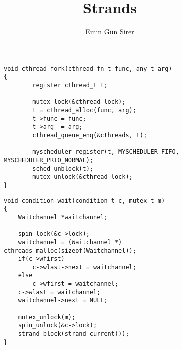 \batchmode
{}
\title{Strands}
\author{Emin G\"un Sirer}

\makeatother
\newenvironment{tex2html_wrap}{}{}
\newwrite\lthtmlwrite
\def\lthtmltypeout#1{{\let\protect\string\immediate\write\lthtmlwrite{#1}}}%
\newbox\sizebox

\pagestyle{empty}
{\newpage
\clearpage
\samepage \begin{figure}[hbt]

\end{figure}
}

{\newpage
\clearpage
\samepage \begin{figure}[hbt]
\begin{verbatim}void cthread_fork(cthread_fn_t func, any_t arg)
{
        register cthread_t t;
        
        mutex_lock(&cthread_lock);
        t = cthread_alloc(func, arg);
        t->func = func;
        t->arg  = arg;
        cthread_queue_enq(&cthreads, t);

        myscheduler_register(t, MYSCHEDULER_FIFO, MYSCHEDULER_PRIO_NORMAL);
        sched_unblock(t);
        mutex_unlock(&cthread_lock);
}
\end{verbatim}

\end{figure}
}

{\newpage
\clearpage
\samepage \begin{figure}[hbt]
\begin{verbatim}void condition_wait(condition_t c, mutex_t m)
{
    Waitchannel *waitchannel;

    spin_lock(&c->lock);
    waitchannel = (Waitchannel *) cthreads_malloc(sizeof(Waitchannel));
    if(c->wfirst)
        c->wlast->next = waitchannel;
    else
        c->wfirst = waitchannel;
    c->wlast = waitchannel;
    waitchannel->next = NULL;

    mutex_unlock(m);
    spin_unlock(&c->lock);
    strand_block(strand_current());
}
\end{verbatim}

\end{figure}
}



